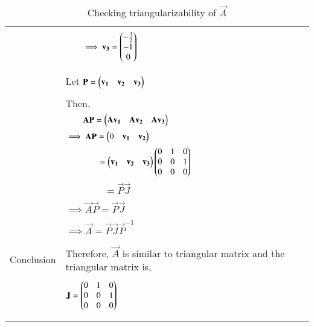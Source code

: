 \begin{longtable}{|c|l|}
	&\\
	& $\qquad\implies \mathbf{v_3}=\begin{pmatrix}-\frac{3}{2}\\-1\\0\end{pmatrix}$\\
	&\\
	\hline
	&\\
	& Let $\Vec{P}=\myvec{\vec{v_1}&\vec{v_2}&\vec{v_3}}$\\
	&\\
	& Then,\\
	& $\qquad\vec{A}\vec{P}=\myvec{\Vec{A}\vec{v_1}&\Vec{A}\vec{v_2}&\Vec{A}\vec{v_3}}$\\
	& $\implies \mathbf{A}\mathbf{P}=\begin{pmatrix}0&\mathbf{v_1}&\mathbf{v_2}\end{pmatrix}$\\
	&$\qquad\qquad = \begin{pmatrix}\mathbf{v_1}&\mathbf{v_2}&\mathbf{v_3}\end{pmatrix}\begin{pmatrix}0&1&0\\0&0&1\\0&0&0\end{pmatrix}$\\
	&$\qquad\qquad=\vec{P}\vec{J}$\\
	&\\
	&$\implies \vec{A}\vec{P}=\vec{P}\vec{J}$\\
	&\\
	&$\implies \vec{A}=\vec{P}\vec{J}\vec{P}^{-1}$\\
	&\\
	\hline
	\multirow{3}{*}{Conclusion} & \\
	& Therefore, $\vec{A}$ is similar to triangular matrix and the triangular matrix is,\\
	&\\
	&$\mathbf{J}=\begin{pmatrix}0&1&0\\0&0&1\\0&0&0\end{pmatrix}$\\
	&\\
	\hline
	\caption{Checking triangularizability of $\vec{A}$}
    \label{eq:solutions/6/4/4/table:2}
\end{longtable}
